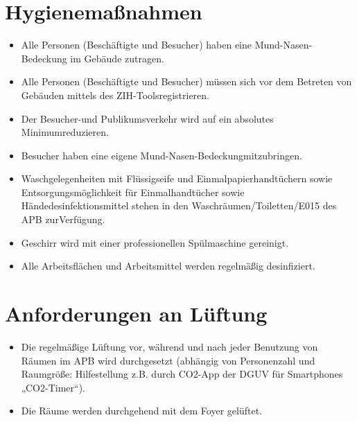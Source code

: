 \documentclass[12pt]{article}
\begin{document}
    \section{Hygienemaßnahmen}
        \begin{itemize}
            \item Alle Personen (Beschäftigte und Besucher) haben eine Mund-Nasen-Bedeckung im Gebäude zutragen.
            \item Alle Personen (Beschäftigte und Besucher) müssen sich vor dem Betreten von Gebäuden mittels des ZIH-Toolsregistrieren.
            \item Der Besucher-und Publikumsverkehr wird auf ein absolutes Minimumreduzieren.
            \item Besucher haben eine eigene Mund-Nasen-Bedeckungmitzubringen.
            \item Waschgelegenheiten mit Flüssigseife und Einmalpapierhandtüchern sowie Entsorgungsmöglichkeit für Einmalhandtücher sowie Händedesinfektionsmittel stehen in den Waschräumen/Toiletten/E015 des APB zurVerfügung.
            \item Geschirr wird mit einer professionellen Spülmaschine gereinigt.
            \item Alle Arbeitsflächen und Arbeitsmittel werden regelmäßig desinfiziert.
        \end{itemize}

    \section{Anforderungen an Lüftung}
        \begin{itemize}
            \item Die regelmäßige Lüftung vor, während und nach jeder Benutzung von Räumen im APB wird durchgesetzt (abhängig von Personenzahl und Raumgröße: Hilfestellung z.B. durch CO2-App der DGUV für Smartphones „CO2-Timer“).
            \item Die Räume werden durchgehend mit dem Foyer gelüftet.
        \end{itemize}
\end{document}
